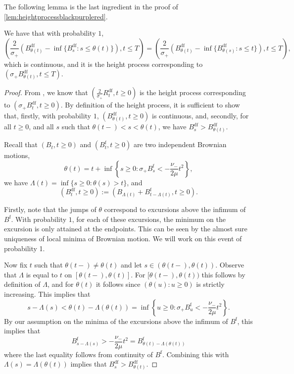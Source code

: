 The following lemma is the last ingredient in the proof of \cref{lem:heightprocessblackpurplered}.
\begin{lemma}\label{lemma.heightprocesstimechange}
We have that with probability $1$, $$\left(\frac{2}{\sigma_+} \left(B^{\mathrm{df}}_{\theta (t)}-\inf\{B^{\mathrm{df}}_{s}:s\leq \theta(t)\}\right), t\leq T \right)=\left(\frac{2}{\sigma_+} \left(B^{\mathrm{df}}_{\theta (t)}-\inf\{B^{\mathrm{df}}_{\theta(s)}:s\leq t\}\right), t\leq T \right),$$ which is continuous, and it is the height process corresponding to $\left(\sigma_+ B^{\mathrm{df}}_{\theta (t)},t\leq T\right)$. 
\end{lemma}
\begin{proof}
From \cite{legallRandomTreesApplications2005}, we know that $\left(\frac{2}{\sigma_+}R^{\mathrm{df}}_t,t\geq 0\right)$ is the height process corresponding to $\left(\sigma_+ B^{\mathrm{df}}_{t},t\geq 0\right)$. By definition of the height process, it is sufficient to show that, firstly, with probability $1$, $(B^{\mathrm{df}}_{\theta(t)},t\geq 0)$ is continuous, and, secondly, for all $t\geq 0$, and all $s$ such that $\theta(t-)<s<\theta(t)$, we have $B^{\mathrm{df}}_s > B^{\mathrm{df}}_{\theta(t)}$.

Recall that $(B_t, t \geq 0)$ and $(B^{\mathrm{f}}_t, t\geq 0)$ are two independent Brownian motions, $$\theta(t)=t+\inf\left\{s\geq 0 : \sigma_+ B^{\mathrm{f}}_s< -\frac{\nu_-}{2\mu} t^2\right\},$$ we have $\Lambda(t)=\inf\{s\geq 0:\theta(s)> t\}$, and 
\begin{equation*}
  \left(B^{\mathrm{df}}_t,t \geq 0\right):=\left( B_{\Lambda(t)}+ B^{\mathrm{f}}_{t-\Lambda(t)}, t\geq 0\right).
\end{equation*}

Firstly, note that the jumps of $\theta$ correspond to excursions above the infimum of $B^{\mathrm{f}}$.  With probability $1$, for each of these excursions, the minimum on the excursion is only attained at the endpoints. This can be seen by the almost sure uniqueness of local minima of Brownian motion. We will work on this event of probability 1.

Now fix $t$ such that $\theta(t-)\neq \theta(t)$ and let $s\in (\theta(t-),\theta(t))$. Observe that $\Lambda$ is equal to $t$ on $[\theta(t-),\theta(t)]$. For $[\theta(t-),\theta(t))$ this follows by definition of $\Lambda$, and for $\theta(t)$ it follows since $(\theta(u):u\geq 0)$ is strictly increasing. This implies that
\begin{equation*}
  s-\Lambda(s)<\theta(t)-\Lambda(\theta(t))=\inf\left\{ u\geq 0: \sigma_+ B_u^{\mathrm{f}}<-\frac{\nu_-}{2\mu} t^2\right\}. 
\end{equation*}
By our assumption on the minima of the excursions above the infimum of $B^{\mathrm{f}}$, this implies that
\begin{equation*}
  B^{\mathrm{f}}_{s-\Lambda(s)}>-\frac{\nu_-}{2\mu} t^2=B^{\mathrm{f}}_{\theta(t)-\Lambda(\theta(t))}
\end{equation*}
where the last equality follows from continuity of $B^{\mathrm{f}}$. Combining this with $\Lambda(s)=\Lambda(\theta(t))$ implies that
$B^{\mathrm{df}}_s>B^{\mathrm{df}}_{\theta(t)}$.


\end{proof}
